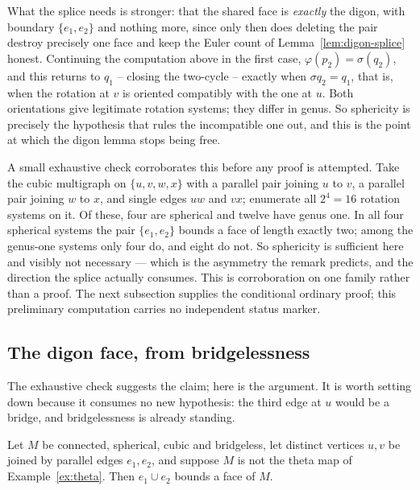 \begin{remark}\label{rem:digon-exact}
What the splice needs is stronger: that the shared face is \emph{exactly}
the digon, with boundary $\{e_1, e_2\}$ and nothing more, since only then
does deleting the pair destroy precisely one face and keep the Euler count
of Lemma~\ref{lem:digon-splice} honest. Continuing the computation above in
the first case, $\varphi(p_2) = \sigma(q_2)$, and this returns to $q_1$ --
closing the two-cycle -- exactly when $\sigma q_2 = q_1$, that is, when the
rotation at $v$ is oriented compatibly with the one at $u$. Both
orientations give legitimate rotation systems; they differ in genus. So
sphericity is precisely the hypothesis that rules the incompatible one out,
and this is the point at which the digon lemma stops being free.

A small exhaustive check corroborates this before any proof is attempted.
Take the cubic multigraph on $\{u,v,w,x\}$ with a parallel pair joining $u$
to $v$, a parallel pair joining $w$ to $x$, and single edges $uw$ and $vx$;
enumerate all $2^4 = 16$ rotation systems on it. Of these, four are spherical
and twelve have genus one. In all four spherical systems the pair $\{e_1,
e_2\}$ bounds a face of length exactly two; among the genus-one systems only
four do, and eight do not. So sphericity is sufficient here and visibly not
necessary --- which is the asymmetry the remark predicts, and the direction
the splice actually consumes. This is corroboration on one family rather than
a proof.  The next subsection supplies the conditional ordinary proof; this
preliminary computation carries no independent status marker.
\end{remark}

\subsection{The digon face, from bridgelessness}

The exhaustive check suggests the claim; here is the argument. It is worth
setting down because it consumes no new hypothesis: the third edge at $u$
would be a bridge, and bridgelessness is already standing.

\begin{lemma}\label{lem:digon-face}
Let $M$ be connected, spherical, cubic and bridgeless, let distinct vertices
$u,v$ be joined by parallel edges $e_1,e_2$, and suppose $M$ is not the theta
map of Example~\ref{ex:theta}. Then $e_1 \cup e_2$ bounds a face of $M$.
\end{lemma}

